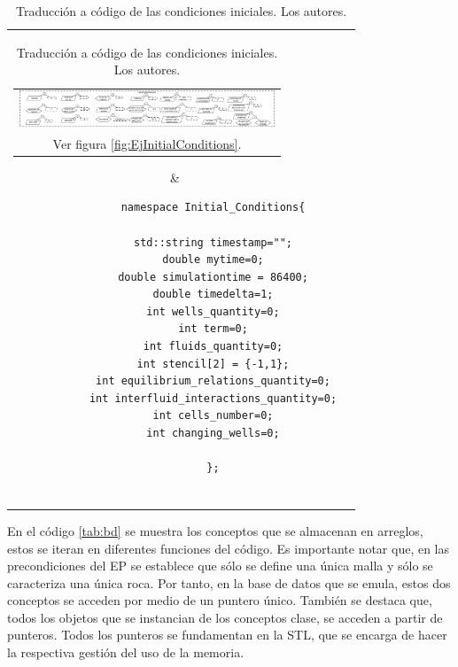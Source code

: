 \begin{table}[h]
	\centering
	\begin{tabular}{cc}
		\parbox[c]{10em}{
			\begin{tabular}[c]{@{}c@{}}\includegraphics[width=3in]{Fig/EjInitialConditions.pdf}\\ Ver figura \ref{fig:EjInitialConditions}.\end{tabular}
		}
		&
		\begin{tiny}
			\begin{lstlisting}
			namespace Initial_Conditions{
			
			std::string timestamp="";
			double mytime=0;
			double simulationtime = 86400;
			double timedelta=1;
			int wells_quantity=0;
			int term=0;
			int fluids_quantity=0;
			int stencil[2] = {-1,1};
			int equilibrium_relations_quantity=0;
			int interfluid_interactions_quantity=0;
			int cells_number=0;
			int changing_wells=0;
			
			};
			
			\end{lstlisting}
		\end{tiny}
	\end{tabular}
	\label{tab:InitialConditions}
	\caption[Traducción a código de las condiciones iniciales.]{Traducción a código de las condiciones iniciales. Los autores.}
\end{table}

En el código \ref{tab:bd} se muestra los conceptos que se almacenan en arreglos, estos se iteran en diferentes funciones del código. Es importante notar que, en las precondiciones del EP se establece que sólo se define una única malla y sólo se caracteriza una única roca. Por tanto, en la base de datos que se emula, estos dos conceptos se acceden por medio de un puntero único. También se destaca que, todos los objetos que se instancian de los conceptos clase, se acceden a partir de punteros. Todos los punteros se fundamentan en la STL, que se encarga de hacer la respectiva gestión del uso de la memoria.\\

